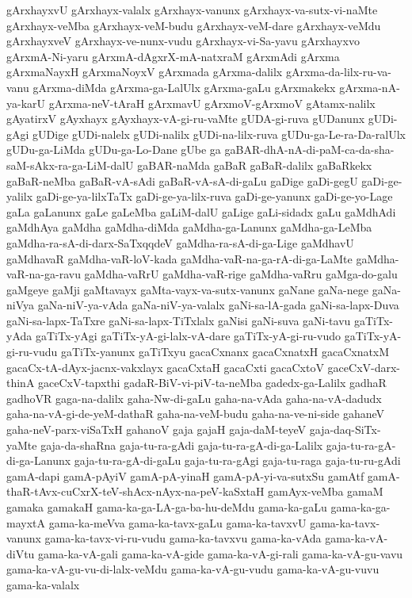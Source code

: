 {gArxhayxvU
gArxhayx-valalx
gArxhayx-vanunx
gArxhayx-va-sutx-vi-naMte
gArxhayx-veMba
gArxhayx-veM-budu
gArxhayx-veM-dare
gArxhayx-veMdu
gArxhayxveV
gArxhayx-ve-nunx-vudu
gArxhayx-vi-Sa-yavu
gArxhayxvo
gArxmA-Ni-yaru
gArxmA-dAgxrX-mA-natxraM
gArxmAdi
gArxma
gArxmaNayxH
gArxmaNoyxV
gArxmada
gArxma-dalilx
gArxma-da-lilx-ru-va-vanu
gArxma-diMda
gArxma-ga-LalUlx
gArxma-gaLu
gArxmakekx
gArxma-nA-ya-karU
gArxma-neV-tAraH
gArxmavU
gArxmoV-gArxmoV
gAtamx-nalilx
gAyatirxV
gAyxhayx
gAyxhayx-vA-gi-ru-vaMte
gUDA-gi-ruva
gUDanunx
gUDi-gAgi
gUDige
gUDi-nalelx
gUDi-nalilx
gUDi-na-lilx-ruva
gUDu-ga-Le-ra-Da-ralUlx
gUDu-ga-LiMda
gUDu-ga-Lo-Dane
gUbe
ga
gaBAR-dhA-nA-di-paM-ca-da-sha-saM-sAkx-ra-ga-LiM-dalU
gaBAR-naMda
gaBaR
gaBaR-dalilx
gaBaRkekx
gaBaR-neMba
gaBaR-vA-sAdi
gaBaR-vA-sA-di-gaLu
gaDige
gaDi-gegU
gaDi-ge-yalilx
gaDi-ge-ya-lilxTaTx
gaDi-ge-ya-lilx-ruva
gaDi-ge-yanunx
gaDi-ge-yo-Lage
gaLa
gaLanunx
gaLe
gaLeMba
gaLiM-dalU
gaLige
gaLi-sidadx
gaLu
gaMdhAdi
gaMdhAya
gaMdha
gaMdha-diMda
gaMdha-ga-Lanunx
gaMdha-ga-LeMba
gaMdha-ra-sA-di-darx-SaTxqqdeV
gaMdha-ra-sA-di-ga-Lige
gaMdhavU
gaMdhavaR
gaMdha-vaR-loV-kada
gaMdha-vaR-na-ga-rA-di-ga-LaMte
gaMdha-vaR-na-ga-ravu
gaMdha-vaRrU
gaMdha-vaR-rige
gaMdha-vaRru
gaMga-do-galu
gaMgeye
gaMji
gaMtavayx
gaMta-vayx-va-sutx-vanunx
gaNane
gaNa-nege
gaNa-niVya
gaNa-niV-ya-vAda
gaNa-niV-ya-valalx
gaNi-sa-lA-gada
gaNi-sa-lapx-Duva
gaNi-sa-lapx-TaTxre
gaNi-sa-lapx-TiTxlalx
gaNisi
gaNi-suva
gaNi-tavu
gaTiTx-yAda
gaTiTx-yAgi
gaTiTx-yA-gi-lalx-vA-dare
gaTiTx-yA-gi-ru-vudo
gaTiTx-yA-gi-ru-vudu
gaTiTx-yanunx
gaTiTxyu
gacaCxnanx
gacaCxnatxH
gacaCxnatxM
gacaCx-tA-dAyx-jacnx-vakxlayx
gacaCxtaH
gacaCxti
gacaCxtoV
gaceCxV-darx-thinA
gaceCxV-tapxthi
gadaR-BiV-vi-piV-ta-neMba
gadedx-ga-Lalilx
gadhaR
gadhoVR
gaga-na-dalilx
gaha-Nw-di-gaLu
gaha-na-vAda
gaha-na-vA-dadudx
gaha-na-vA-gi-de-yeM-dathaR
gaha-na-veM-budu
gaha-na-ve-ni-side
gahaneV
gaha-neV-parx-viSaTxH
gahanoV
gaja
gajaH
gaja-daM-teyeV
gaja-daq-SiTx-yaMte
gaja-da-shaRna
gaja-tu-ra-gAdi
gaja-tu-ra-gA-di-ga-Lalilx
gaja-tu-ra-gA-di-ga-Lanunx
gaja-tu-ra-gA-di-gaLu
gaja-tu-ra-gAgi
gaja-tu-raga
gaja-tu-ru-gAdi
gamA-dapi
gamA-pAyiV
gamA-pA-yinaH
gamA-pA-yi-va-sutxSu
gamAtf
gamA-thaR-tAvx-cuCxrX-teV-shAcx-nAyx-na-peV-kaSxtaH
gamAyx-veMba
gamaM
gamaka
gamakaH
gama-ka-ga-LA-ga-ba-hu-deMdu
gama-ka-gaLu
gama-ka-ga-mayxtA
gama-ka-meVva
gama-ka-tavx-gaLu
gama-ka-tavxvU
gama-ka-tavx-vanunx
gama-ka-tavx-vi-ru-vudu
gama-ka-tavxvu
gama-ka-vAda
gama-ka-vA-diVtu
gama-ka-vA-gali
gama-ka-vA-gide
gama-ka-vA-gi-rali
gama-ka-vA-gu-vavu
gama-ka-vA-gu-vu-di-lalx-veMdu
gama-ka-vA-gu-vudu
gama-ka-vA-gu-vuvu
gama-ka-valalx
}
